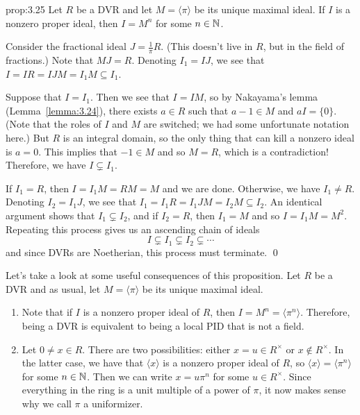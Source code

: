 \begin{prop}{prop:3.25}
    Let $R$ be a DVR and let $M = \langle \pi \rangle$ be its unique maximal ideal. 
    If $I$ is a nonzero proper ideal, then $I = M^n$ for some $n \in \mathbb{N}$. 
\end{prop}\vspace{-0.25cm}
\begin{pf}
    Consider the fractional ideal $J = \frac{1}{\pi}R$. (This 
    doesn't live in $R$, but in the field of fractions.) Note that $MJ = R$. 
    Denoting $I_1 = IJ$, we see that $I = IR = IJM = I_1M \subseteq I_1$.
    
    Suppose that $I = I_1$. Then we see that $I = IM$, so by Nakayama's lemma 
    (Lemma~\ref{lemma:3.24}), there exists $a \in R$ such that $a - 1 \in M$ 
    and $aI = \{0\}$. (Note that the roles of $I$ and $M$ are switched; 
    we had some unfortunate notation here.) But $R$ is an integral domain, 
    so the only thing that can kill a nonzero ideal is $a = 0$. This 
    implies that $-1 \in M$ and so $M = R$, which is a contradiction! 
    Therefore, we have $I \subsetneq I_1$. 

    If $I_1 = R$, then $I = I_1 M = RM = M$ and we are done. Otherwise, 
    we have $I_1 \neq R$. Denoting $I_2 = I_1 J$, we see that 
    $I_1 = I_1 R = I_1 J M = I_2 M \subseteq I_2$. An identical argument 
    shows that $I_1 \subsetneq I_2$, and if $I_2 = R$, then 
    $I_1 = M$ and so $I = I_1 M = M^2$. 
    Repeating this process gives us an ascending chain of ideals 
    \[ I \subsetneq I_1 \subsetneq I_2 \subsetneq \cdots \] 
    and since DVRs are Noetherian, this process must terminate. \qed
\end{pf}\vspace{-0.25cm}
Let's take a look at some useful consequences of this proposition.
Let $R$ be a DVR and as usual, let $M = \langle \pi \rangle$ be its 
unique maximal ideal.
\begin{enumerate}[(1)]
    \item Note that if $I$ is a nonzero proper ideal of $R$, then 
    $I = M^n = \langle \pi^n \rangle$. Therefore, being a DVR is 
    equivalent to being a local PID that is not a field. 
    \item Let $0 \neq x \in R$. There are two possibilities: 
    either $x = u \in R^\times$ or $x \notin R^\times$. In the latter case, 
    we have that $\langle x \rangle$ is a nonzero proper ideal of $R$, so 
    $\langle x \rangle = \langle \pi^n \rangle$ for some $n \in \mathbb{N}$. 
    Then we can write $x = u\pi^n$ for some $u \in R^\times$. Since 
    everything in the ring is a unit multiple of a power of $\pi$, it 
    now makes sense why we call $\pi$ a uniformizer. 
\end{enumerate}

